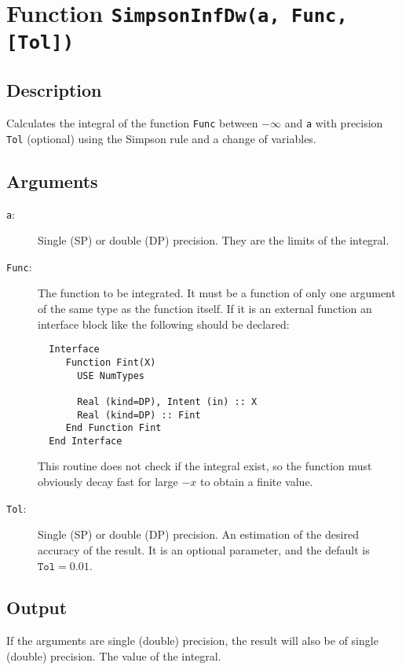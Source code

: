 \section{Function \texttt{SimpsonInfDw(a, Func, [Tol])}}

\subsection{Description}

Calculates the integral of the function \texttt{Func} between
$- \infty$ and \texttt{a} with precision \texttt{Tol} (optional) using
the Simpson rule and a change of variables.


\subsection{Arguments}

\begin{description}
\item[\texttt{a}:] Single (SP) or double (DP) precision. They are
  the limits of the integral.
\item[\texttt{Func}:] The function to be integrated. It must be a
  function of only one argument of the same type as the function
  itself. If it is an
  external function an interface block like the following should be
  declared: 
\begin{verbatim}
  Interface 
     Function Fint(X)
       USE NumTypes

       Real (kind=DP), Intent (in) :: X
       Real (kind=DP) :: Fint
     End Function Fint
  End Interface
\end{verbatim}
  This routine does not check if the integral exist, so the function
  must obviously decay fast for large $-x$ to obtain a finite value.
\item[\texttt{Tol}:] Single (SP) or double (DP) precision. An
  estimation of the desired accuracy of the result. It is an optional
  parameter, and the default is $\mathtt{Tol} = 0.01$. 
\end{description}


\subsection{Output}

If the arguments are single (double) precision, the result will also be of
single (double) precision. The value of the integral.


